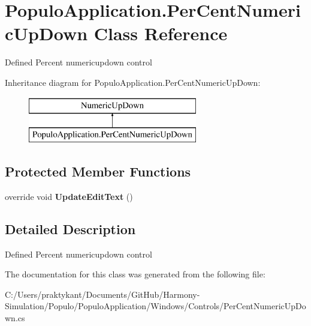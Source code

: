\hypertarget{class_populo_application_1_1_per_cent_numeric_up_down}{\section{Populo\+Application.\+Per\+Cent\+Numeric\+Up\+Down Class Reference}
\label{class_populo_application_1_1_per_cent_numeric_up_down}
}


Defined Percent numericupdown control  


Inheritance diagram for Populo\+Application.\+Per\+Cent\+Numeric\+Up\+Down\+:\begin{figure}[H]
\begin{center}
\leavevmode
\includegraphics[height=2.000000cm]{class_populo_application_1_1_per_cent_numeric_up_down}
\end{center}
\end{figure}
\subsection*{Protected Member Functions}
\begin{DoxyCompactItemize}
\item 
\hypertarget{class_populo_application_1_1_per_cent_numeric_up_down_a11e3c2c4bab813f1d4f0dfd2b0314d6e}{override void {\bfseries Update\+Edit\+Text} ()}\label{class_populo_application_1_1_per_cent_numeric_up_down_a11e3c2c4bab813f1d4f0dfd2b0314d6e}

\end{DoxyCompactItemize}


\subsection{Detailed Description}
Defined Percent numericupdown control 



The documentation for this class was generated from the following file\+:\begin{DoxyCompactItemize}
\item 
C\+:/\+Users/praktykant/\+Documents/\+Git\+Hub/\+Harmony-\/\+Simulation/\+Populo/\+Populo\+Application/\+Windows/\+Controls/Per\+Cent\+Numeric\+Up\+Down.\+cs\end{DoxyCompactItemize}
